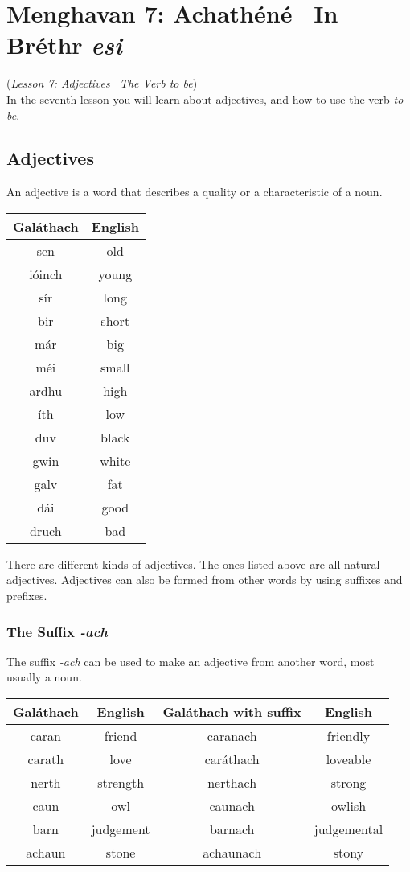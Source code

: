 \section{Menghavan 7: Achath\'{e}n\'{e} \textemdash\ In Br\'{e}thr \textit{esi}}
(\textit{Lesson 7: Adjectives \textemdash\ The Verb \textit{to be}})\\

In the seventh lesson you will learn about adjectives, and how to use the verb \textit{to be}.

\subsection{Adjectives}

An adjective is a word that describes a quality or a characteristic of a noun.
\begin{table}[H]
\centering
\begin{tabu}{c|c}
  \textbf{Gal\'{a}thach} & \textbf{English}\\
  \toprule
  sen & old\\
  i\'{o}inch & young\\
  s\'{i}r & long\\
  bir & short\\
  m\'{a}r & big\\
  m\'{e}i & small\\
  ardhu & high\\
  \'{i}th & low\\
  duv & black\\
  gwin & white\\
  galv & fat\\
  d\'{a}i & good\\
  druch & bad
\end{tabu}
\label{examples_adjective}
\end{table}

There are different kinds of adjectives. The ones listed above are all natural adjectives. Adjectives can also be formed from other words by using suffixes and prefixes.

\subsubsection{The Suffix \textit{-ach}}

The suffix \textit{-ach} can be used to make an adjective from another word, most usually a noun.
\begin{table}[H]
\centering
\begin{tabu}{c|c|c|c}
  \textbf{Gal\'{a}thach} & \textbf{English} & \textbf{Gal\'{a}thach with suffix} & \textbf{English}\\
  \toprule
  caran & friend & caranach & friendly\\
  carath & love & car\'{a}thach & loveable\\
  nerth & strength & nerthach & strong\\
  caun & owl & caunach & owlish\\
  barn & judgement & barnach & judgemental\\
  achaun & stone & achaunach & stony
\end{tabu}
\label{examples_suffix_ach}
\end{table}

